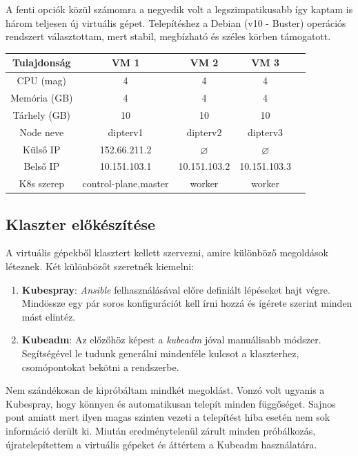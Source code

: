 A fenti opciók közül számomra a negyedik volt a legszimpatikusabb így kaptam is három teljesen új virtuális gépet. Telepítéshez a Debian (v10 - Buster) operációs rendszert választottam, mert stabil, megbízható és széles körben támogatott. 

\begin{center}
\begin{tabular}{ c||cccc| } 
\hline 
Tulajdonság & VM 1 & VM 2 & VM 3 \\
\hline \hline
CPU (mag) & 4 & 4 & 4 \\ 
Memória (GB) & 4 & 4 & 4 \\
Tárhely (GB) & 10 & 10 & 10 \\  
Node neve & dipterv1 & dipterv2 & dipterv3 \\ 
Külső IP & 152.66.211.2 & $\varnothing$ & $\varnothing$ \\ 
Belső IP & 10.151.103.1 & 10.151.103.2 & 10.151.103.3 \\
K8s szerep& control-plane,master & worker & worker \\
\hline
\end{tabular}
\end{center}

\subsection{Klaszter előkészítése}
A virtuális gépekből klasztert kellett szervezni, amire különböző megoldások léteznek.\citep{kubernetesInstall} Két különbözőt szeretnék kiemelni:
\begin{enumerate}
  \item \textbf{Kubespray}: \textit{Ansible} felhasználásával előre definiált lépéseket hajt végre. Mindössze egy pár soros konfigurációt kell írni hozzá és ígérete szerint minden mást elintéz.
  \item \textbf{Kubeadm}: Az előzőhöz képest a \textit{kubeadm} jóval manuálisabb módszer. Segítségével le tudunk generálni mindenféle kulcsot a klaszterhez, csomópontokat bekötni a rendszerbe.
\end{enumerate}

Nem szándékosan de kipróbáltam mindkét megoldást. Vonzó volt ugyanis a Kubespray, hogy könnyen és automatikusan telepít minden függőséget. Sajnos pont amiatt mert ilyen magas szinten vezeti a telepítést hiba esetén nem sok információ derült ki. Miután eredménytelenül zárult minden próbálkozás, újratelepítettem a virtuális gépeket és áttértem a Kubeadm használatára. 

